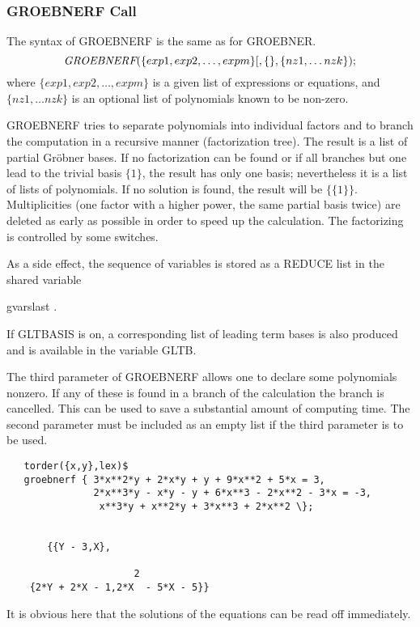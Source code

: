 \subsubsection{GROEBNERF Call}
The syntax of GROEBNERF is the same as for GROEBNER.
\[
\mbox{\it GROEBNERF}(\{exp1, exp2, \ldots , expm\}
         [,\{\},\{nz1, \ldots nzk\});
\]
where $\{exp1, exp2, \ldots , expm\} $ is a given list of expressions or
equations, and $\{nz1, \ldots nzk\}$ is
an optional list of polynomials known to be non-zero.

GROEBNERF tries to separate polynomials into individual factors and
to branch the computation in a recursive manner (factorization tree).
The result is a list of partial Gr\"obner bases. If no factorization can
be found or if all branches but one lead to the trivial basis $\{1\}$,
the result has only one basis; nevertheless it is a list of lists of
polynomials. If no solution is found, the result will be $\{\{1\}\}$.
Multiplicities (one factor with a higher power, the same partial basis
twice) are deleted as early as possible in order to speed up the
calculation. The factorizing is controlled by some switches.

As a side effect, the sequence of variables is stored as a REDUCE list in
the shared variable
\begin{center}
gvarslast .
\end{center}
If GLTBASIS is on, a corresponding list of leading term bases is
also produced and is available in the variable GLTB.

The third parameter of GROEBNERF allows one to declare some polynomials
nonzero. If any of these is found in a branch of the calculation
the branch is cancelled. This can be used to save a substantial amount
of computing time. The second parameter must be included as an
empty list if the third parameter is to be used.

\begin{verbatim}
   torder({x,y},lex)$
   groebnerf { 3*x**2*y + 2*x*y + y + 9*x**2 + 5*x = 3,
               2*x**3*y - x*y - y + 6*x**3 - 2*x**2 - 3*x = -3,
                x**3*y + x**2*y + 3*x**3 + 2*x**2 \};


       {{Y - 3,X},

                      2
    {2*Y + 2*X - 1,2*X  - 5*X - 5}}
\end{verbatim}

It is obvious here that the solutions of the equations can be read
off immediately.

